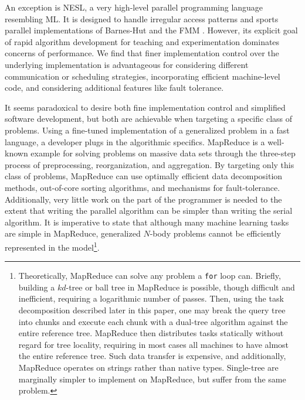 \documentclass[twoside,leqno,twocolumn]{article}
\begin{document}
An exception is NESL, a very high-level parallel programming language resembling ML.
It is designed to handle irregular access patterns and sports parallel implementations of Barnes-Hut and the FMM \cite{blelloch_nbody}.
However, its explicit goal of rapid algorithm development for teaching and experimentation dominates concerns of performance.
We find that finer implementation control over the underlying implementation is advantageous for considering different communication or scheduling strategies, incorporating efficient machine-level code, and considering additional features like fault tolerance.

It seems paradoxical to desire both fine implementation control and simplified software development, but both are achievable when targeting a specific class of problems.
Using a fine-tuned implementation of a generalized problem in a fast language, a developer plugs in the algorithmic specifics.
MapReduce \cite{mapreduce} is a well-known example for solving problems on massive data sets through the three-step process of preprocessing, reorganization, and aggregation.
By targeting only this class of problems, MapReduce can use optimally efficient data decomposition methods, out-of-core sorting algorithms, and mechanisms for fault-tolerance.
Additionally, very little work on the part of the programmer is needed to the extent that writing the parallel algorithm can be simpler than writing the serial algorithm.
It is imperative to state that although many machine learning tasks are simple in MapReduce, generalized $N$-body problems cannot be efficiently represented in the model\footnote{
  Theoretically, MapReduce can solve any problem a {\tt for} loop can.
  Briefly, building a $kd$-tree or ball tree in MapReduce is possible, though difficult and inefficient, requiring a logarithmic number of passes.
  Then, using the task decomposition described later in this paper, one may break the query tree into chunks and execute each chunk with a dual-tree algorithm against the entire reference tree.
  MapReduce then distributes tasks statically without regard for tree locality, requiring in most cases all machines to have almost the entire reference tree.
  Such data transfer is expensive, and additionally, MapReduce operates on strings rather than native types.
  Single-tree are marginally simpler to implement on MapReduce, but suffer from the same problem.
  }.
\end{document}
